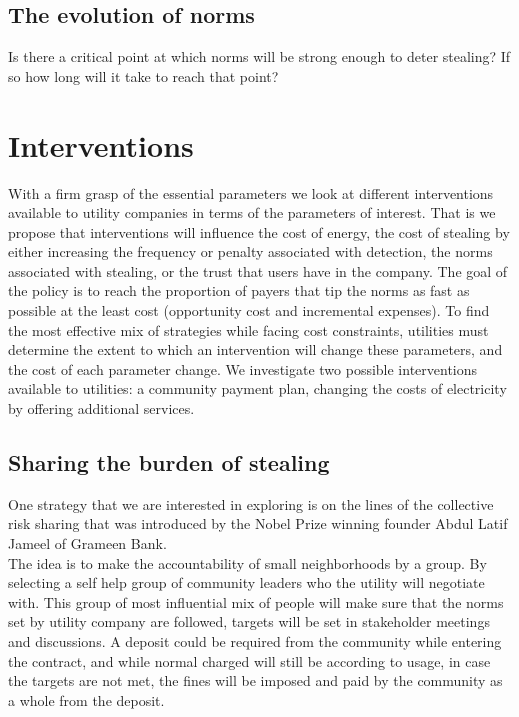 \documentclass{article}
\begin{document}
\subsection{The evolution of norms}
Is there a critical point at which norms will be strong enough to deter stealing? If so how long will it take to reach that point? 

\section{Interventions}
With a firm grasp of the essential parameters we look at different interventions available to utility companies in terms of the parameters of interest. That is we propose that interventions will influence the cost of energy, the cost of stealing by either increasing the frequency or penalty associated with detection, the norms associated with stealing, or the trust that users have in the company. The goal of the policy is to reach the proportion of payers that tip the norms as fast as possible at the least cost (opportunity cost and incremental expenses). To find the most effective mix of strategies while facing cost constraints, utilities must determine the extent to which an intervention will change these parameters, and the cost of each parameter change. We investigate two possible interventions available to utilities: a community payment plan, changing the costs of electricity by offering additional services. 

\listoftodos

\subsection{Sharing the burden of stealing}
One strategy that we are interested in exploring is on the lines of the collective risk sharing that was introduced by the Nobel Prize winning founder Abdul Latif Jameel of Grameen Bank. \\

The idea is to make the accountability of small neighborhoods by a group. By selecting a self help group of community leaders who the utility will negotiate with. This group of most influential mix of people will make sure that the norms set by utility company are followed, targets will be set in stakeholder meetings and discussions. A deposit could be required from the community while entering the contract, and while normal charged will still be according to usage, in case the targets are not met, the fines will be imposed and paid by the community as a whole from the deposit. \\
\end{document}
